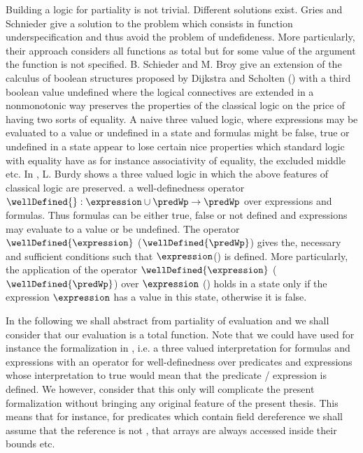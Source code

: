 Building a logic for partiality is not trivial. Different solutions exist. 
Gries and Schnieder \cite{gries95avoiding} give a solution to the problem which consists in function 
underspecification  and thus  avoid the problem of undefideness.
 More particularly, their approach considers all functions as total but for some value of the argument 
the function is not specified.  B. Schieder and M. Broy \cite{schieder99adapting} give 
  an extension  of the calculus of boolean structures proposed by Dijkstra and Scholten (\cite{WPCDS}) with a  third boolean value 
undefined where  the logical connectives are extended in a nonmonotonic way preserves the properties of the classical logic
on the price  of having two sorts of equality.
A naive three valued logic, where expressions may be evaluated to a value or  undefined  in a state and
 formulas might be false, true or undefined in a state appear to lose certain nice properties
 which standard logic with equality have
as for instance associativity of equality, the excluded middle \cite{gries95avoiding} etc. 
In \cite{burdy98treatment}, L. Burdy shows a three valued logic in which the above features of classical logic are preserved.
a well-definedness operator $\wellDefined{}: \expression \cup \predWp \rightarrow \predWp$ over expressions and formulas. Thus formulas can be either true, false or not defined and
expressions may evaluate to a value or be undefined. The operator  $\wellDefined{\expression}$ ($\wellDefined{\predWp}$) 
 gives the, necessary and sufficient
 conditions such that $\expression$(\predWp ) is defined.
 More particularly, the application of the operator   $\wellDefined{\expression}$  ($\wellDefined{\predWp}$) over $\expression$  (\predWp ) 
 holds in a state only if the expression $\expression$ has  a value in this state, otherwise it is false.

In the following we shall abstract from partiality of evaluation and we shall consider that our evaluation is a total function. 
Note that we could have used for instance the formalization in \cite{burdy98treatment}, i.e. 
a three valued interpretation for formulas and expressions with an operator for well-definedness over predicates and expressions 
whose interpretation to true would mean that the predicate / expression is defined. We however, consider that this only will complicate 
the present formalization without bringing any original feature of the present thesis. 
This means that for instance, for predicates which contain field dereference  we shall assume that the reference is not \Mynull,
that arrays are always accessed inside their bounds etc. 

